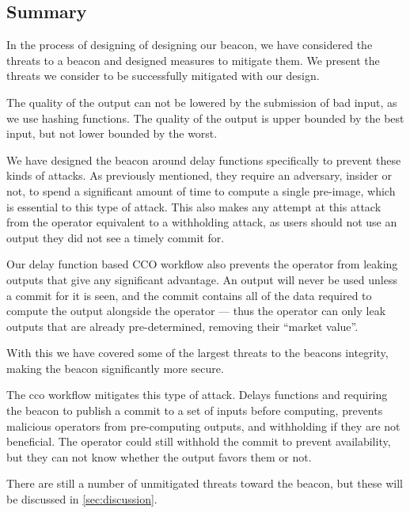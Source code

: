 \subsection{Summary}
In the process of designing of designing our beacon, we have considered the threats to a beacon and designed measures to mitigate them. We present the threats we consider to be successfully mitigated with our design.

The quality of the output can not be lowered by the submission of bad input, as we use hashing functions. The quality of the output is upper bounded by the best input, but not lower bounded by the worst. 

We have designed the beacon around delay functions specifically to prevent these kinds of attacks. As previously mentioned, they require an adversary, insider or not, to spend a significant amount of time to compute a single pre-image, which is essential to this type of attack.
This also makes any attempt at this attack from the operator equivalent to a withholding attack, as users should not use an output they did not see a timely commit for.

Our delay function based CCO workflow also prevents the operator from leaking outputs that give any significant advantage. An output will never be used unless a commit for it is seen, and the commit contains all of the data required to compute the output alongside the operator --- thus the operator can only leak outputs that are already pre-determined, removing their \enquote{market value}.

With this we have covered some of the largest threats to the beacons integrity, making the beacon significantly more secure.

The \acrshort{cco} workflow mitigates this type of attack. Delays functions and requiring the beacon to publish a commit to a set of inputs before computing, prevents malicious operators from pre-computing outputs, and withholding if they are not beneficial. The operator could still withhold the commit to prevent availability, but they can not know whether the output favors them or not.

There are still a number of unmitigated threats toward the beacon, but these will be discussed in \vref{sec:discussion}.